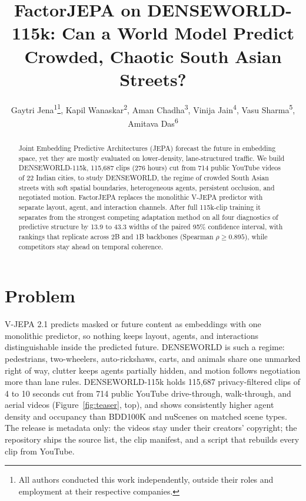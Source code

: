 \documentclass[letterpaper]{article} %
\title{FactorJEPA on DENSEWORLD-115k: Can a World Model Predict Crowded, Chaotic South Asian Streets?}
\author{
    Gaytri Jena\textsuperscript{\rm 1}\thanks{All authors conducted this work independently, outside their roles and employment at their respective companies.},
    Kapil Wanaskar\textsuperscript{\rm 2},
    Aman Chadha\textsuperscript{\rm 3},
    Vini{}ja Jain\textsuperscript{\rm 4},  %
    Vasu Sharma\textsuperscript{\rm 5},
    Amitava Das\textsuperscript{\rm 6}
}
\begin{document}
\maketitle

\begin{abstract}
Joint Embedding Predictive Architectures (JEPA) forecast the future in embedding space, yet they are mostly evaluated on lower-density, lane-structured traffic. We build DENSEWORLD-115k, 115,687 clips (276 hours) cut from 714 public YouTube videos of 22 Indian cities, to study DENSEWORLD, the regime of crowded South Asian streets with soft spatial boundaries, heterogeneous agents, persistent occlusion, and negotiated motion. FactorJEPA replaces the monolithic V-JEPA predictor with separate layout, agent, and interaction channels. After full 115k-clip training it separates from the strongest competing adaptation method on all four diagnostics of predictive structure by 13.9 to 43.3 widths of the paired 95\% confidence interval, with rankings that replicate across 2B and 1B backbones (Spearman $\rho \geq 0.895$), while competitors stay ahead on temporal coherence.
\end{abstract}

\begin{links}
\end{links}

\section{Problem}

V-JEPA 2.1 \cite{murlabadia2026vjepa21} predicts masked or future content as embeddings with one monolithic predictor, so nothing keeps layout, agents, and interactions distinguishable inside the predicted future. DENSEWORLD is such a regime: pedestrians, two-wheelers, auto-rickshaws, carts, and animals share one unmarked right of way, clutter keeps agents partially hidden, and motion follows negotiation more than lane rules. DENSEWORLD-115k holds 115,687 privacy-filtered clips of 4 to 10 seconds cut from 714 public YouTube drive-through, walk-through, and aerial videos (Figure~\ref{fig:teaser}, top), and shows consistently higher agent density and occupancy than BDD100K and nuScenes on matched scene types. The release is metadata only: the videos stay under their creators' copyright; the repository ships the source list, the clip manifest, and a script that rebuilds every clip from YouTube.
\end{document}
